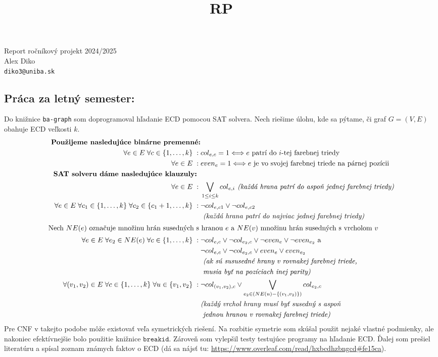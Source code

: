 \documentclass[11pt]{article}
\begin{document}
\title{RP}
\begin{center}
    {\LARGE Report ročníkový projekt 2024/2025}\\[1em]
    {\large Alex Diko  \\ \texttt{diko3@uniba.sk}}\\[1em]
\end{center}
\subsection*{Práca za letný semester:}
Do knižnice \texttt{ba-graph} som doprogramoval hľadanie ECD
pomocou SAT solvera. Nech riešime úlohu, kde sa pýtame, či graf $G = (V,E)$ obahuje
ECD veľkosti $k$.
\begin{align*}
\textbf{ Použijeme nasledujúce binárne premenné:}&\\
\forall e \in E \; \forall c \in \{1,\ldots,k\}\; : \; &col_{e,c} = 1 \Longleftrightarrow
\text{$e$ patrí do $i$-tej farebnej triedy}\\
\forall e\in E \;: \;&even_{e} = 1\Longleftrightarrow \text{$e$ je vo svojej 
farebnej triede na párnej pozícii}\\
\textbf{SAT solveru dáme nasledujúce klauzuly: }&\\
\forall e \in E \; : \; &\bigvee_{1\leq i \leq k} col_{e,i}  \textit{ (každá
hrana patrí do aspoň jednej farebnej triedy)}\\
\forall e \in E \; \forall c_1 \in \{1,\ldots, k\} \; \forall c_2 \in \{c_1+1,\ldots,k\}\; : \; &
\lnot col_{e,c1} \lor \lnot col_{e,c2} \\&\textit{ (každá hrana patrí do najviac
jednej farebnej triedy)}\\
\shortintertext{Nech $NE(e)$ označuje množinu hrán susedných s hranou $e$ a $NE(v)$ množinu
hrán susedných s vrcholom $v$}
\forall e \in E \; \forall e_2 \in NE(e)\; \forall c \in \{1,\ldots,k\} 
\;: \; &\lnot col_{e,c} \lor \lnot col_{e_2,c}
\lor \lnot even_{e} \lor \lnot even_{e_2} \text{ a }\\
&\lnot col_{e,c} \lor \lnot col_{e_2,c} \lor even_{e} \lor even_{e_2} \\&\textit{ (ak sú sususedné hrany
v rovnakej farebnej triede, } \\&\textit{ musia byť na pozíciach inej parity)}\\
\forall (v_1,v_2) \in E \; \forall c \in \{1, \ldots, k\} \; \forall 
u \in \{v_1,v_2\} \;: \; &\lnot col_{(v_1,v_2),c} \lor \bigvee_{e_2 \in (NE(u) - \{(v_1,v_2)\})} 
col_{e_2, c}\\
&\textit{(každý vrchol hrany musí byť susedný s aspoň}\\
&\textit{ jednou hranou v rovnakej farebnej triede)}
\end{align*}
Pre CNF v takejto podobe môže existovať veľa symetrických
riešení. Na rozbitie symetrie som skúšal použit nejaké vlastné podmienky,
ale nakoniec efektívnejšie bolo použitie knižnice $\texttt{breakid}$.
Zároveň som vylepšil testy testujúce programy na hľadanie ECD. Ďalej
som prešiel literatúru a spísal zoznam známych faktov o ECD (dá sa nájsť
tu: \url{https://www.overleaf.com/read/hxbcdhzbngcd#fe15ca}).
\end{document}
